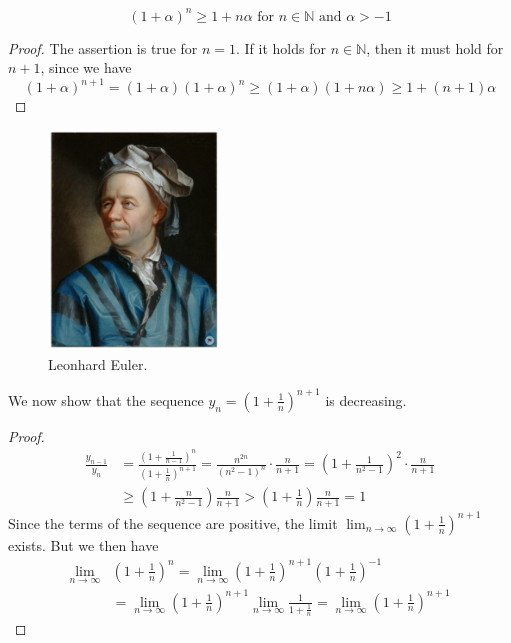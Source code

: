 \documentclass[a4paper,12pt]{article} %
\begin{document}
\[(1+\alpha)^n \ge 1 + n\alpha \text{ for } n \in \mathbb{N} \text{ and } \alpha > -1 \]
\begin{proof}
    The assertion is true for $n=1$. If it holds for $n \in \mathbb{N}$,
    then it must hold for $n+1$, since we have 
    \[(1+\alpha)^{n+1}=(1+\alpha)(1+\alpha)^n\ge(1+\alpha)(1+n\alpha)\ge1+(n+1)\alpha\]
\end{proof}
\graphicspath{{../Figs/}}
\begin{figure}[htbp]
    \centering
    \includegraphics[width=0.4\textwidth]{Euler.png}
    \caption{Leonhard Euler.}
    \label{fig:fig1}
\end{figure}


We now show that the sequence $\displaystyle y_n = \left(1+\frac{1}{n}\right)^{n+1}$
is decreasing.
\begin{proof}
    \[
    \begin{split}
        \frac{y_{n-1}}{y_n} &=\frac{\left(1+\frac{1}{n-1}\right)^n}{\left(1+\frac{1}{n}\right)^{n+1}}
         = \frac{n^{2n}}{(n^2-1)^n}\cdot\frac{n}{n+1} = \left(1+\frac{1}{n^2-1}\right)^2
         \cdot\frac{n}{n+1}\\
        & \ge \left(1+\frac{n}{n^2-1}\right)\frac{n}{n+1} > \left(1+\frac{1}{n}\right)
        \frac{n}{n+1} = 1
    \end{split}
    \]
Since the terms of the sequence are positive, the limit 
    $\displaystyle \lim_{n \to \infty} \left(1+\frac{1}{n}\right)^{n+1}$
    exists. But we then have 
    \[ \begin{split}
        \lim_{n \to \infty} &\left(1+\frac{1}{n}\right)^n = \lim_{n \to \infty} \left(1+\frac{1}{n}\right)^{n+1}
        \left(1+\frac{1}{n}\right)^{-1}  \\
        & = \lim_{n \to \infty}\left(1+\frac{1}{n}\right)^{n+1} 
        \lim_{n \to \infty} \frac{1}{1+\frac{1}{n}}=
        \lim_{n \to \infty}\left(1+\frac{1}{n}\right)^{n+1} 
    \end{split}
    \]
\end{proof}
\end{document}

